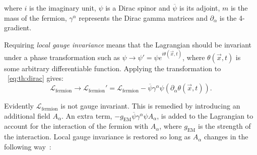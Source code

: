 where $i$ is the imaginary unit, $\psi$ is a Dirac spinor and $\overline{\psi}$ is its adjoint, $m$ is the mass of the fermion, $\gamma^{\alpha}$ represents the Dirac gamma matrices and $\partial_{\alpha}$ is the 4-gradient. 

Requiring \emph{local gauge invariance} means that the Lagrangian should be  invariant under a phase transformation such as
$\psi \rightarrow \psi'= \psi e^{i\theta(\vec{x},t)}$, where $\theta(\vec{x},t)$ is some arbitrary differentiable function. Applying the transformation to \Eq~\ref{eq:th:dirac} gives:
\begin{equation}
\label{eq:th:dirac_lagrangian_not_invariant_local_gauge_transf}
\mathcal{L}_{\textrm{fermion}} \rightarrow \mathcal{L}_{\textrm{fermion}}'=  \mathcal{L}_{\textrm{fermion}} - \overline{\psi} \gamma^{\alpha} \psi (\partial_{\alpha} \theta(\vec{x},t)).
\end{equation}

Evidently $\mathcal{L}_{\textrm{fermion}}$ is not gauge invariant.
This is remedied by introducing an additional field $A_\alpha$. An extra term, $- g_{\textrm{EM}}\overline{\psi}\gamma^{\alpha}\psi A_{\alpha}$, is added to the Lagrangian to account for the interaction of the fermion with $A_\alpha$,
where $g_{\textrm{EM}}$ is the strength of the interaction. Local gauge invariance is restored so long as $A_\alpha$ changes in the following way~\cite{griffiths2008introduction}: 

